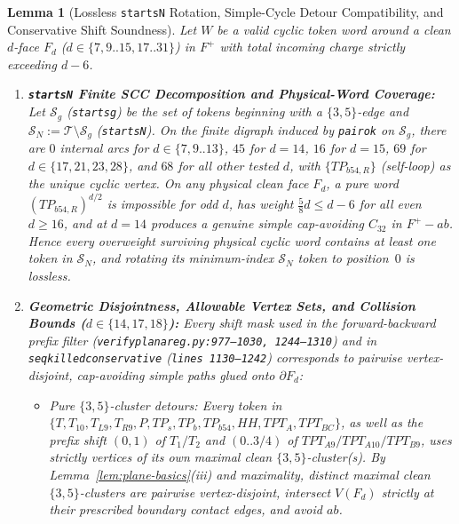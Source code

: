 \documentclass[11pt,reqno]{amsart}
\theoremstyle{plain}
\newtheorem{lemma}[theorem]{Lemma}
\theoremstyle{definition}
\theoremstyle{remark}
\DeclareRobustCommand{\_}{\ifmmode\text{\textunderscore}\else\textunderscore\allowbreak\fi}
\begin{document}
\begin{lemma}[Lossless \texttt{starts\_N} Rotation, Simple-Cycle Detour Compatibility, and Conservative Shift Soundness]\label{lem:startsN}
Let $W$ be a valid cyclic token word around a clean $d$-face $F_d$ ($d \in \{7, 9..15, 17..31\}$) in $F^+$ with total incoming charge strictly exceeding $d - 6$.
\begin{enumerate}[label=(\roman*),leftmargin=2.2em]
  \item \textbf{\texttt{starts\_N} Finite SCC Decomposition and Physical-Word Coverage:} Let $\mathcal{S}_g$ (\texttt{starts\_g}) be the set of tokens beginning with a $\{3,5\}$-edge and $\mathcal{S}_N := \mathcal{T} \setminus \mathcal{S}_g$ (\texttt{starts\_N}). On the finite digraph induced by \texttt{pair\_ok} on $\mathcal{S}_g$, there are $0$ internal arcs for $d \in \{7, 9..13\}$, $45$ for $d = 14$, $16$ for $d = 15$, $69$ for $d \in \{17, 21, 23, 28\}$, and $68$ for all other tested $d$, with $\{TP_{b54,R}\}$ (self-loop) as the \emph{unique} cyclic vertex. On any physical clean face $F_d$, a pure word $(TP_{b54,R})^{d/2}$ is impossible for odd $d$, has weight $\frac{5}{8} d \le d - 6$ for all even $d \ge 16$, and at $d = 14$ produces a genuine simple cap-avoiding $C_{32}$ in $F^+ - ab$. Hence every overweight surviving physical cyclic word contains at least one token in $\mathcal{S}_N$, and rotating its minimum-index $\mathcal{S}_N$ token to position~$0$ is lossless.
  \item \textbf{Geometric Disjointness, Allowable Vertex Sets, and Collision Bounds ($d \in \{14, 17, 18\}$):} Every shift mask used in the forward-backward prefix filter (\texttt{verify\_planar\_eg.py:977--1030, 1244--1310}) and in \texttt{seq\_killed\_conservative} (\texttt{lines 1130--1242}) corresponds to pairwise vertex-disjoint, cap-avoiding simple paths glued onto $\partial F_d$:
  \begin{itemize}[leftmargin=1.5em]
    \item \emph{Pure $\{3,5\}$-cluster detours:} Every token in $\{T,\allowbreak T_{10},\allowbreak T_{L9},\allowbreak T_{R9},\allowbreak P,\allowbreak TP_s,\allowbreak TP_b,\allowbreak TP_{b54},\allowbreak HH,\allowbreak TPT_A,\allowbreak TPT_{BC}\}$, as well as the prefix shift $(0,1)$ of $T_1/T_2$ and $(0..3/4)$ of $TPT_{A9}/\allowbreak TPT_{A10}/\allowbreak TPT_{B9}$, uses strictly vertices of its own maximal clean $\{3,5\}$-cluster(s). By Lemma~\ref{lem:plane-basics}(iii) and maximality, distinct maximal clean $\{3,5\}$-clusters are pairwise vertex-disjoint, intersect $V(F_d)$ strictly at their prescribed boundary contact edges, and avoid $ab$.

\end{itemize}
\end{enumerate}
\end{lemma}
\end{document}
